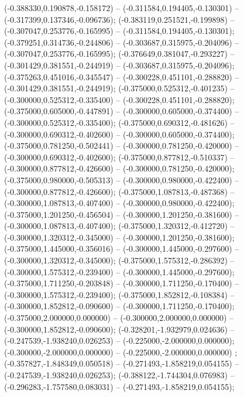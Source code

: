  (-0.388330,0.190878,-0.158172) -- (-0.311584,0.194405,-0.130301) -- (-0.317399,0.137346,-0.096736);
 (-0.383119,0.251521,-0.199898) -- (-0.307047,0.253776,-0.165995) -- (-0.311584,0.194405,-0.130301);
 (-0.379251,0.314736,-0.244806) -- (-0.303687,0.315975,-0.204096) -- (-0.307047,0.253776,-0.165995);
 (-0.376649,0.381047,-0.293227) -- (-0.301429,0.381551,-0.244919) -- (-0.303687,0.315975,-0.204096);
 (-0.375263,0.451016,-0.345547) -- (-0.300228,0.451101,-0.288820) -- (-0.301429,0.381551,-0.244919);
 (-0.375000,0.525312,-0.401235) -- (-0.300000,0.525312,-0.335400) -- (-0.300228,0.451101,-0.288820);
 (-0.375000,0.605000,-0.447891) -- (-0.300000,0.605000,-0.374400) -- (-0.300000,0.525312,-0.335400);
 (-0.375000,0.690312,-0.481626) -- (-0.300000,0.690312,-0.402600) -- (-0.300000,0.605000,-0.374400);
 (-0.375000,0.781250,-0.502441) -- (-0.300000,0.781250,-0.420000) -- (-0.300000,0.690312,-0.402600);
 (-0.375000,0.877812,-0.510337) -- (-0.300000,0.877812,-0.426600) -- (-0.300000,0.781250,-0.420000);
 (-0.375000,0.980000,-0.505313) -- (-0.300000,0.980000,-0.422400) -- (-0.300000,0.877812,-0.426600);
 (-0.375000,1.087813,-0.487368) -- (-0.300000,1.087813,-0.407400) -- (-0.300000,0.980000,-0.422400);
 (-0.375000,1.201250,-0.456504) -- (-0.300000,1.201250,-0.381600) -- (-0.300000,1.087813,-0.407400);
 (-0.375000,1.320312,-0.412720) -- (-0.300000,1.320312,-0.345000) -- (-0.300000,1.201250,-0.381600);
 (-0.375000,1.445000,-0.356016) -- (-0.300000,1.445000,-0.297600) -- (-0.300000,1.320312,-0.345000);
 (-0.375000,1.575312,-0.286392) -- (-0.300000,1.575312,-0.239400) -- (-0.300000,1.445000,-0.297600);
 (-0.375000,1.711250,-0.203848) -- (-0.300000,1.711250,-0.170400) -- (-0.300000,1.575312,-0.239400);
 (-0.375000,1.852812,-0.108384) -- (-0.300000,1.852812,-0.090600) -- (-0.300000,1.711250,-0.170400);
 (-0.375000,2.000000,0.000000) -- (-0.300000,2.000000,0.000000) -- (-0.300000,1.852812,-0.090600);
 (-0.328201,-1.932979,0.024636) -- (-0.247539,-1.938240,0.026253) -- (-0.225000,-2.000000,0.000000);
 (-0.300000,-2.000000,0.000000) -- (-0.225000,-2.000000,0.000000) ;
 (-0.357827,-1.848349,0.050518) -- (-0.271493,-1.858219,0.054155) -- (-0.247539,-1.938240,0.026253);
 (-0.388122,-1.744304,0.076983) -- (-0.296283,-1.757580,0.083031) -- (-0.271493,-1.858219,0.054155);
